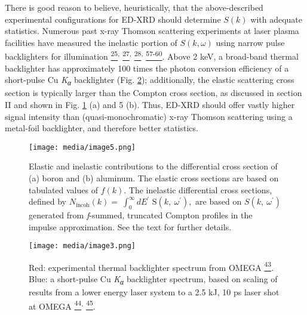 There is good reason to believe, heuristically, that the above-described
experimental configurations for ED-XRD should determine
\(S\left( k \right)\) with adequate statistics. Numerous past x-ray
Thomson scattering experiments at laser plasma facilities have measured
the inelastic portion of \(S\left( k,\omega \right)\) using narrow pulse
backlighters for illumination
\hyperref[s.-h.-glenzer-and-r.-redmer-reviews-of-modern-physics-81-1625-2009.]{\textsuperscript{25}}\textsuperscript{,}
\hyperref[h.-j.-lee-et-al.-physical-review-letters-102-115001-2009.]{\textsuperscript{27}}\textsuperscript{,}
\hyperref[c.-fortmann-h.-j.-lee-t.-doeppner-r.-w.-falcone-a.-l.-kritcher-o.-l.-landen-and-s.-h.-glenzer-physical-review-letters-108-175006-2012.]{\textsuperscript{28}}\textsuperscript{,}
\hyperref[r.-tommasini-et-al.-review-of-scientific-instruments-79-10e901-2008.]{\textsuperscript{57-60}}.
Above 2 keV, a broad-band thermal backlighter has approximately 100
times the photon conversion efficiency of a short-pulse Cu
\emph{K\textsubscript{α}} backlighter (Fig. \ref{edimage3}); additionally, the
elastic scattering cross section is typically larger than the Compton
cross section, as discussed in section II and shown in Fig. \ref{edimage5} (a) and 5
(b). Thus, ED-XRD should offer vastly higher signal intensity than
(quasi-monochromatic) x-ray Thomson scattering using a metal-foil
backlighter, and therefore better statistics.

\begin{figure}[!ht] 
\caption{ Elastic and inelastic contributions to the differential cross
section of (a) boron and (b) aluminum. The elastic cross sections are
based on tabulated values of \(f(k)\). The inelastic differential cross
sections, defined by
\(N_{\text{incoh}}\left( k \right) = \ \int_{0}^{\infty}{dE^{'}}\text{\ S}\left( k,\ \omega^{'} \right),\)
are based on \(S\left( k,\ \omega^{'} \right)\) generated from
\emph{f}-summed, truncated Compton profiles in the impulse
approximation. See the text for further details.}
\label{edimage5}
\centering
\texttt{[image: media/image5.png]}
\end{figure}

\FloatBarrier

\begin{figure}[h] 
\caption{ Red: experimental thermal
backlighter spectrum from OMEGA
\hyperref[b.-yaakobi-2012-private-communication.]{\textsuperscript{43}}\emph{.}
Blue: a short-pulse Cu \emph{K\textsubscript{α}} backlighter spectrum,
based on scaling of results from a lower energy laser system to a 2.5
kJ, 10 ps laser shot at OMEGA
\hyperref[p.-m.-nilson-2012-private-communication.]{\textsuperscript{44}}\textsuperscript{,}
\hyperref[k.-u.-akli-et-al.-physics-of-plasmas-14-023102-2007.]{\textsuperscript{45}}\hyperref[b.-a.-mattern-g.-t.-seidler-j.-j.-kas-j.-i.-pacold-and-j.-j.-rehr-physical-review-b-85-115135-2012.]{}.}
\label{edimage3}
\centering
\texttt{[image: media/image3.png]}
\end{figure}

